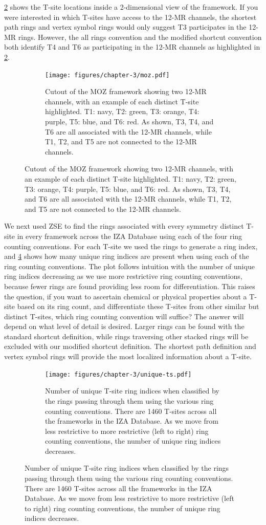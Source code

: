 \documentclass[preprint,numrefs,noinfo,sort&compress]{elsarticle}
\begin{document}
\cref{fig:moz} shows the T-site locations inside a 2-dimensional view of the framework. If you were interested in which T-sites have access to the 12-MR channels, the shortest path rings and vertex symbol rings would only suggest T3 participates in the 12-MR rings. However, the all rings convention and the modified shortcut convention both identify T4 and T6 as participating in the 12-MR channels as highlighted in \cref{fig:moz}. 

\begin{figure}
\begin{figure}[H]
\centering
\texttt{[image: figures/chapter-3/moz.pdf]}
\caption{Cutout of the MOZ framework showing two 12-MR channels, with an example of each distinct T-site highlighted. T1: navy, T2: green, T3: orange, T4: purple, T5: blue, and T6: red. As shown, T3, T4, and T6 are all associated with the 12-MR channels, while T1, T2, and T5 are not connected to the 12-MR channels. \label{fig:moz}}
\end{figure}
\end{figure}

We next used ZSE to find the rings associated with every symmetry distinct T-site in every framework across the IZA Database using each of the four ring counting conventions. For each T-site we used the rings to generate a ring index, and \cref{fig:unique-ts} shows how many unique ring indices are present when using each of the ring counting conventions. The plot follows intuition with the number of unique ring indices decreasing as we use more restrictive ring counting conventions, because fewer rings are found providing less room for differentiation. This raises the question, if you want to ascertain chemical or physical properties about a T-site based on its ring count, and differentiate these T-sites from other similar but distinct T-sites, which ring counting convention will suffice? The answer will depend on what level of detail is desired. Larger rings can be found with the standard shortcut definition, while rings traversing other stacked rings will be excluded with our modified shortcut definition. The shortest path definition and vertex symbol rings will provide the most localized information about a T-site. 

\begin{figure}
\begin{figure}[H]
\centering
\texttt{[image: figures/chapter-3/unique-ts.pdf]}
\caption{Number of unique T-site ring indices when classified by the rings passing through them using the various ring counting conventions. There are 1460 T-sites across all the frameworks in the IZA Database. As we move from less restrictive to more restrictive (left to right) ring counting conventions, the number of unique ring indices decreases. \label{fig:unique-ts}}
\end{figure}
\end{figure}
\end{document}
